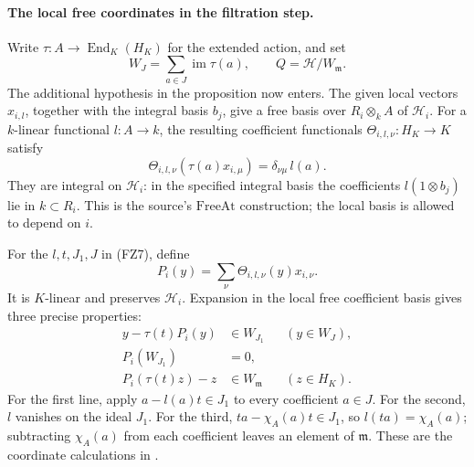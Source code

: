 \paragraph{The local free coordinates in the filtration step.}
Write \(\tau:A\to\operatorname{End}_K(H_K)\) for the
extended action, and set
\[
       W_J=\sum_{a\in J}\operatorname{im}\tau(a),\qquad
       Q=\mathcal H/W_{\mathfrak m}.
\]
The additional hypothesis in the proposition now enters.
The given local vectors \(x_{i,l}\), together with the
integral basis \(b_j\), give a free basis over
\(R_i\otimes_k A\) of \(\mathcal H_i\).
For a \(k\)-linear functional \(l:A\to k\), the resulting
coefficient functionals
\(\Theta_{i,l,\nu}:H_K\to K\) satisfy
\[
 \Theta_{i,l,\nu}(\tau(a)x_{i,\mu})
                               =\delta_{\nu\mu}\,l(a).
\]
They are integral on \(\mathcal H_i\):
in the specified integral basis the coefficients
\(l(1\otimes b_j)\) lie in \(k\subset R_i\).
This is the source's \(\mathrm{FreeAt}\) construction;
the local basis is allowed to depend on \(i\).

For the \(l,t,J_1,J\) in (FZ7), define
\[
                           P_i(y)=
                           \sum_\nu\Theta_{i,l,\nu}(y)x_{i,\nu}.
\]
It is \(K\)-linear and preserves \(\mathcal H_i\).
Expansion in the local free coefficient basis gives
three precise properties:
\[
 \begin{split}
 y-\tau(t)P_i(y)&\in W_{J_1} &&(y\in W_J),\\
                         P_i(W_{J_1})&=0,\\
 P_i(\tau(t)z)-z&\in W_{\mathfrak m} &&(z\in H_K).
 \end{split}
 \tag{FZ8}\label{eq:faithful-filtration-local-maps}
\]
For the first line, apply
\(a-l(a)t\in J_1\) to every coefficient \(a\in J\).
For the second, \(l\) vanishes on the ideal \(J_1\).
For the third,
\(ta-\chi_A(a)t\in J_1\), so
\(l(ta)=\chi_A(a)\); subtracting \(\chi_A(a)\)
from each coefficient leaves an element of
\(\mathfrak m\).
These are the coordinate calculations in
.

